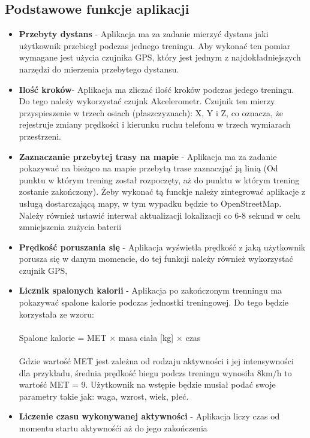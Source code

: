 \subsection{\large Podstawowe funkcje aplikacji} 
\begin{itemize}
    \item \textbf{Przebyty dystans} - Aplikacja ma za zadanie mierzyć dystans jaki użytkownik przebiegł podczas jednego treningu. Aby wykonać ten pomiar wymagane jest użycia czujnika GPS, który jest jednym z najdokładniejszych narzędzi do mierzenia przebytego dystansu.
    \item \textbf{Ilość kroków}- Aplikacja ma zliczać ilość kroków podczas jedego treningu. Do tego należy wykorzystać czujnk Akcelerometr. Czujnik ten mierzy przyspieszenie w trzech osiach (płaszczyznach): X, Y i Z, co oznacza, że rejestruje zmiany prędkości i kierunku ruchu telefonu w trzech wymiarach przestrzeni.
    \item \textbf{Zaznaczanie przebytej trasy na mapie} - Aplikacja ma za zadanie pokazywać na bieżąco na mapie przebytą trase zaznaczjąć ją linią (Od punktu w którym trening został rozpoczęty, aż do punktu w którym trening zostanie zakończony). Żeby wykonać tą funckje należy zintegrować aplikacje z usługą dostarczającą mapy, w tym wypadku będzie to OpenStreetMap. Należy również ustawić interwał aktualizacji lokalizacji co 6-8 sekund w celu zmniejszenia zużycia baterii 
    \item \textbf{Prędkość poruszania się} - Aplikacja wyświetla prędkość z jaką użytkownik porusza się w danym momencie, do tej funkcji należy również wykorzystać czujnik GPS, 
    \item \textbf{Licznik spalonych kalorii} - Aplikacja po zakończonym trenningu ma pokazywać spalone kalorie podczas jednostki treningowej. Do tego będzie korzystała ze wzoru:
    \\
    \\
    Spalone kalorie = MET × masa ciała [kg] × czas 
    \\
    \\
    Gdzie wartość MET jest zależna od rodzaju aktywności i jej intensywności dla przykładu, średnia prędkość biegu podczs treningu wynosiła 8km/h to wartość MET = 9. Użytkownik na wstępie będzie musiał podać swoje parametry takie jak: waga, wzrost, wiek, płeć.
    \item \textbf{Liczenie czasu wykonywanej aktywności} - Aplikacja liczy czas od momentu startu aktywnośći aż do jego zakończenia  


\end{itemize}
